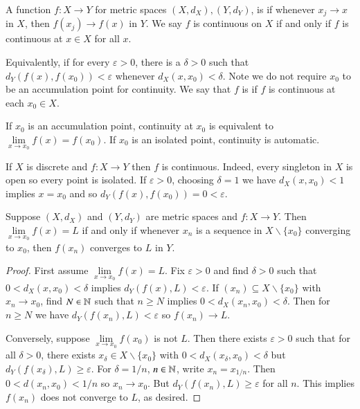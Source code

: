 \begin{definition}
    A function $f:X\rightarrow Y$ for metric spaces $(X,d_X), (Y,d_Y)$, is  if whenever $x_j \rightarrow x$ in $X$, then $f(x_j)\rightarrow f(x)$ in $Y$. We say $f$ is continuous on $X$ if and only if $f$ is continuous at $x \in X$ for all $x$.

    Equivalently,  if for every $\varepsilon > 0$, there is a $\delta > 0$ such that $d_Y(f(x),f(x_0)) < \varepsilon$ whenever $d_X(x,x_0) < \delta$. Note we do not require $x_0$ to be an accumulation point for continuity. We say that $f$ is  if $f$ is continuous at each $x_0 \in X$.
\end{definition}

If $x_0$ is an accumulation point, continuity at $x_0$ is equivalent to $\lim\limits_{x\rightarrow x_0}f(x) = f(x_0)$. If $x_0$ is an isolated point, continuity is automatic.

\begin{example}
    If $X$ is discrete and $f:X\rightarrow Y$ then $f$ is continuous. Indeed, every singleton in $X$ is open so every point is isolated. If $\varepsilon > 0$, choosing $\delta = 1$ we have $d_X(x,x_0) < 1$ implies $x = x_0$ and so $d_Y(f(x),f(x_0)) = 0 < \varepsilon$.
\end{example}


\begin{proposition}
    Suppose $(X,d_X)$ and $(Y,d_Y)$ are metric spaces and $f:X\rightarrow Y$. Then $\lim\limits_{x\rightarrow x_0}f(x) = L$ if and only if whenever $x_n$ is a sequence in $X\backslash\{x_0\}$ converging to $x_0$, then $f(x_n)$ converges to $L$ in $Y$.
\end{proposition}
\begin{proof}
    First assume $\lim\limits_{x\rightarrow x_0}f(x) = L$. Fix $\varepsilon > 0$ and find $\delta > 0$ such that $0 < d_X(x,x_0) < \delta$ implies $d_Y(f(x),L) < \varepsilon$. If $(x_n) \subseteq X\backslash\{x_0\}$ with $x_n\rightarrow x_0$, find $N \in \mathbb N$ such that $n \geq N$ implies $0 < d_X(x_n,x_0) < \delta$. Then for $n \geq N$ we have $d_Y(f(x_n),L) < \varepsilon$ so $f(x_n)\rightarrow L$. 

    Conversely, suppose $\lim\limits_{x\rightarrow x_0}f(x_0)$ is not $L$. Then there exists $\varepsilon > 0$ such that for all $\delta > 0$, there exists $x_{\delta} \in X\backslash\{x_0\}$ with $0 < d_X(x_{\delta},x_0) < \delta$ but $d_Y(f(x_{\delta}),L) \geq \varepsilon$. For $\delta= 1/n$, $n \in \mathbb N$, write $x_n = x_{1/n}$. Then $0 < d(x_n,x_0) < 1/n$ so $x_n\rightarrow x_0$. But $d_Y(f(x_n),L) \geq \varepsilon$ for all $n$. This implies $f(x_n)$ does not converge to $L$, as desired.
\end{proof}


